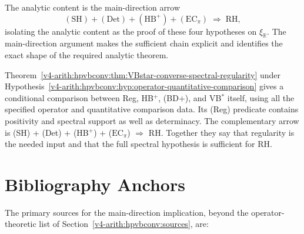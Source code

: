 \begin{remark}
\label{v4-arith:w5-j:rem:contribution}
The analytic content is the main-direction arrow
\[
(\mathrm{SH})+(\mathrm{Det})+(\mathrm{HB}^{+})+(\mathrm{EC}_\pi)\;\Longrightarrow\;\mathrm{RH},
\]
isolating the analytic content as the proof of these four
hypotheses on \(\xi_{\mathbb R}\). The main-direction argument
makes the sufficient chain explicit and identifies the exact shape of
the required analytic theorem.
\end{remark}

\begin{remark}
\label{v4-arith:w5-j:rem:construction2-relation}
Theorem~\ref{v4-arith:hpvbconv:thm:VBstar-converse-spectral-regularity} under Hypothesis~\ref{v4-arith:hpvbconv:hyp:operator-quantitative-comparison}
gives a conditional comparison between Reg, HB\(^{+}\), (BD+),
and VB\(^{*}\) itself, using all the specified operator and
quantitative comparison data. Its (Reg) predicate contains positivity
and spectral support as well as determinacy.  The complementary arrow is
(SH) + (Det) + (HB\(^{+}\)) + (\(\mathrm{EC}_\pi\)) \(\Rightarrow\) RH.  Together
they say that regularity is the needed input and that the full
spectral hypothesis is sufficient for RH.
\end{remark}

\section{Bibliography Anchors}
\label{v4-arith:w5-j:bibliography}

The primary sources for the main-direction implication, beyond the
operator-theoretic list of Section~\ref{v4-arith:hpvbconv:sources}, are:

